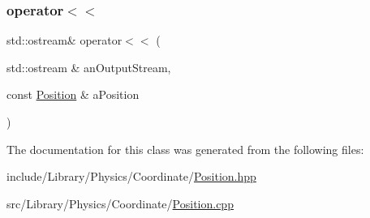 \subsubsection{\texorpdfstring{operator$<$$<$}{operator<<}}
{\footnotesize\ttfamily std\+::ostream\& operator$<$$<$ (\begin{DoxyParamCaption}\item[{std\+::ostream \&}]{an\+Output\+Stream,  }\item[{const \hyperlink{classlibrary_1_1physics_1_1coord_1_1_position}{Position} \&}]{a\+Position }\end{DoxyParamCaption})\hspace{0.3cm}{\ttfamily [friend]}}



The documentation for this class was generated from the following files\+:\begin{DoxyCompactItemize}
\item 
include/\+Library/\+Physics/\+Coordinate/\hyperlink{_position_8hpp}{Position.\+hpp}\item 
src/\+Library/\+Physics/\+Coordinate/\hyperlink{_position_8cpp}{Position.\+cpp}\end{DoxyCompactItemize}
